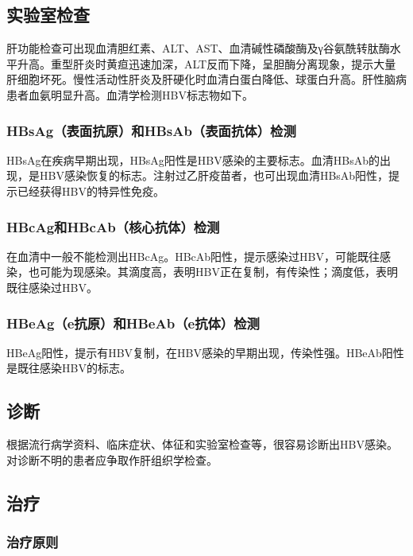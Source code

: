 \subsection{实验室检查}

肝功能检查可出现血清胆红素、ALT、AST、血清碱性磷酸酶及γ谷氨酰转肽酶水平升高。重型肝炎时黄疸迅速加深，ALT反而下降，呈胆酶分离现象，提示大量肝细胞坏死。慢性活动性肝炎及肝硬化时血清白蛋白降低、球蛋白升高。肝性脑病患者血氨明显升高。血清学检测HBV标志物如下。

\subsubsection{HBsAg（表面抗原）和HBsAb（表面抗体）检测}

HBsAg在疾病早期出现，HBsAg阳性是HBV感染的主要标志。血清HBsAb的出现，是HBV感染恢复的标志。注射过乙肝疫苗者，也可出现血清HBsAb阳性，提示已经获得HBV的特异性免疫。

\subsubsection{HBcAg和HBcAb（核心抗体）检测}

在血清中一般不能检测出HBcAg。HBcAb阳性，提示感染过HBV，可能既往感染，也可能为现感染。其滴度高，表明HBV正在复制，有传染性；滴度低，表明既往感染过HBV。

\subsubsection{HBeAg（e抗原）和HBeAb（e抗体）检测}

HBeAg阳性，提示有HBV复制，在HBV感染的早期出现，传染性强。HBeAb阳性是既往感染HBV的标志。

\subsection{诊断}

根据流行病学资料、临床症状、体征和实验室检查等，很容易诊断出HBV感染。对诊断不明的患者应争取作肝组织学检查。

\subsection{治疗}

\subsubsection{治疗原则}

